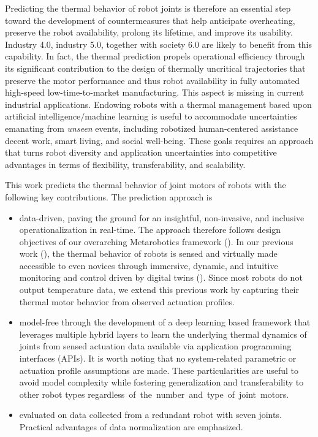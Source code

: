 \documentclass{ifacconf}
\begin{document}
Predicting the thermal behavior of robot joints is therefore an essential step toward the development of countermeasures that help anticipate overheating, preserve the robot availability,  prolong its lifetime, and improve its usability. Industry 4.0, industry 5.0, together with society 6.0 are likely to benefit from this capability. In fact, the thermal prediction propels operational efficiency through its significant contribution to the design of thermally uncritical trajectories that  preserve the motor performance and thus robot availability in fully automated high-speed low-time-to-market manufacturing. This aspect is missing in current industrial applications. Endowing robots with a thermal management based upon artificial intelligence$\slash$machine learning is useful to accommodate uncertainties emanating from \textit{unseen} events, including robotized human-centered assistance decent work, smart living, and social well-being. These goals requires an approach that turns robot diversity and application uncertainties into competitive advantages in terms of flexibility,  transferability, and scalability.

This work predicts  the thermal behavior of joint motors of robots with the following key contributions. The prediction approach is
\begin{itemize}
	\item data-driven, paving the ground for an  insightful, non-invasive, and inclusive operationalization in real-time. The approach therefore follows  design objectives of our overarching Metarobotics framework (\cite{kaigom2023metarobotics}). In our previous work (\cite{abt}), the thermal behavior of  robots is sensed and virtually made accessible to even novices through  immersive, dynamic, and intuitive monitoring and control driven by digital twins (\cite{kaigom2020value}). Since most robots do not output temperature data, we extend this previous work by capturing their thermal motor behavior from observed  actuation profiles.
	\item model-free through the development of a deep learning based framework that leverages multiple hybrid layers to learn the underlying thermal dynamics of joints from sensed actuation data  available via  application programming interfaces (APIs). It is worth noting that no system-related parametric or actuation profile assumptions are made. These  particularities are useful to avoid model complexity while fostering generalization and transferability to other robot types \mbox{regardless of the number and type of joint motors.}
	\item evaluated on data collected from a redundant robot with seven joints. Practical advantages of data normalization are emphasized.
\end{itemize}
\end{document}
